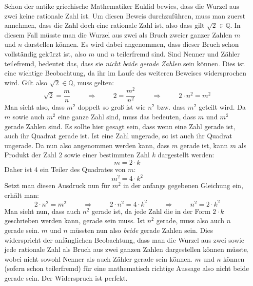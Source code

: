 Schon der antike griechische Mathematiker Euklid bewies, dass die Wurzel aus zwei keine rationale Zahl ist. Um diesen Beweis durchzuf\"{u}hren, muss man zuerst annehmen, dass die Zahl doch eine rationale Zahl ist, also dass gilt $\sqrt{2} \in \mathbb{Q}$. In diesem Fall m\"{u}sste man die Wurzel aus zwei als Bruch zweier ganzer Zahlen $m$ und $n$ darstellen k\"{o}nnen. Es wird dabei angenommen, dass dieser Bruch schon vollst\"{a}ndig gek\"{u}rzt ist, also $m$ und $n$ teilerfremd sind. Sind Nenner und Z\"{a}hler teilefremd, bedeutet das, dass sie \emph{nicht beide gerade Zahlen} sein k\"{o}nnen. Dies ist eine wichtige Beobachtung, da ihr im Laufe des weiteren Beweises widersprochen wird. Gilt also $\sqrt{2} \in \mathbb{Q}$, muss gelten: $$\sqrt{2} = \frac{m}{n}
\hspace{1cm} \Rightarrow \hspace{1cm} 2 = \frac{m^2}{n^2} \hspace{1cm} \Rightarrow \hspace{1cm} 2 \cdot n^2 = m^2$$ Man sieht also, dass $m^2$ doppelt so gro\ss{} ist wie $n^2$ bzw. dass $m^2$ geteilt wird. Da $m$ sowie auch $m^2$ eine ganze Zahl sind, muss das bedeuten, dass $m$ und $m^2$ gerade Zahlen sind. Es sollte hier gesagt sein, dass wenn eine Zahl gerade ist, auch ihr Quadrat gerade ist. Ist eine Zahl ungerade, so ist auch ihr Quadrat ungerade. Da nun also angenommen werden kann, dass $m$ gerade ist, kann $m$ als Produkt der Zahl $2$ sowie einer bestimmten Zahl $k$ dargestellt werden: $$m = 2 \cdot k$$ Daher ist 4 ein Teiler des Quadrates von $m$: $$m^2 = 4 \cdot k^2$$ Setzt man diesen Ausdruck nun f\"{u}r $m^2$ in der anfangs gegebenen Gleichung ein, erh\"{a}lt man: $$2 \cdot n^2 = m^2 \hspace{1cm} \Rightarrow \hspace{1cm} 2 \cdot n^2 = 4 \cdot k^2 \hspace{1cm} \Rightarrow \hspace{1cm} n^2 = 2 \cdot k^2$$ Man sieht nun, dass auch $n^2$ gerade ist, da jede Zahl die in der Form $2 \cdot k$ geschrieben werden kann, gerade sein muss. Ist $n^2$ gerade, muss also auch $n$ gerade sein. $m$ und $n$ m\"{u}ssten nun also \emph{beide} gerade Zahlen sein. Dies widerspricht der anf\"{a}nglichen Beobachtung, dass man die Wurzel aus zwei sowie jede rationale Zahl als Bruch aus zwei ganzen Zahlen dargestellen k\"{o}nnen m\"{u}sste, wobei nicht sowohl Nenner als auch Z\"{a}hler gerade sein k\"{o}nnen. $m$ und $n$ k\"{o}nnen (sofern schon teilerfremd) f\"{u}r eine mathematisch richtige Aussage also nicht beide gerade sein. Der Widerspruch ist perfekt.

